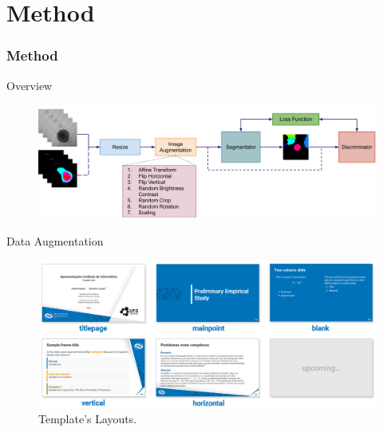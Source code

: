 \section{Method}


\begin{frame}{}
    \frametitle{Method}
\end{frame}


\begin{frame}{Overview}
    \begin{figure}[!htb]
    \centering
        \includegraphics[width=15cm]{figures/method/overview}
        \label{fig:method_overview}
    \end{figure}
\end{frame}


\begin{frame}{Data Augmentation}
    \begin{figure}
        \centering
        \includegraphics[width=.9\textwidth]{readme/layouts.png}
        \caption{Template's Layouts.}
        \label{fig:data_aug}
    \end{figure}
\end{frame}


